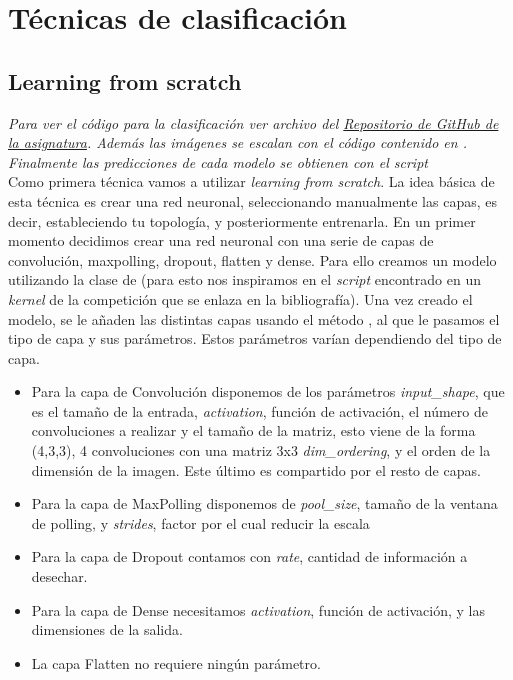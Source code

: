 \section{Técnicas de clasificación}

\subsection{Learning from scratch}

\emph{Para ver el código para la clasificación ver archivo  del \href{https://github.com/Griger/Intel-CervicalCancer-KaggleCompetition}{Repositorio de GitHub de la asignatura}. Además las imágenes se escalan con el código contenido en . Finalmente las predicciones de cada modelo se obtienen con el script }\\

Como primera técnica vamos a utilizar \textit{learning from scratch}. La idea básica de esta técnica es crear una red neuronal, seleccionando manualmente las capas, es decir, estableciendo tu topología, y posteriormente entrenarla. En un primer momento decidimos crear una red neuronal con una serie de capas de convolución, maxpolling, dropout, flatten y dense. Para ello creamos un modelo utilizando la clase  de  (para esto nos inspiramos en el \textit{script} encontrado en un \textit{kernel} de la competición que se enlaza en la bibliografía). Una vez creado el modelo, se le añaden las distintas capas usando el método , al que le pasamos el tipo de capa y sus parámetros. Estos parámetros varían dependiendo del tipo de capa.

\begin{itemize}
\item Para la capa de Convolución disponemos de los parámetros \textit{input\_shape}, que es el tamaño de la entrada, \textit{activation}, función de activación, el número de convoluciones a realizar y el tamaño de la matriz, esto viene de la forma (4,3,3), 4 convoluciones con una matriz 3x3 \textit{dim\_ordering}, y el orden de la dimensión de la imagen. Este último es compartido por el resto de capas. 
\item Para la capa de MaxPolling disponemos de \textit{pool\_size}, tamaño de la ventana de polling, y \textit{strides}, factor por el cual reducir la escala
\item Para la capa de Dropout contamos con \textit{rate}, cantidad de información a desechar.
\item Para la capa de Dense necesitamos \textit{activation}, función de activación, y las dimensiones de la salida.
\item La capa Flatten no requiere ningún parámetro.
\end{itemize}

